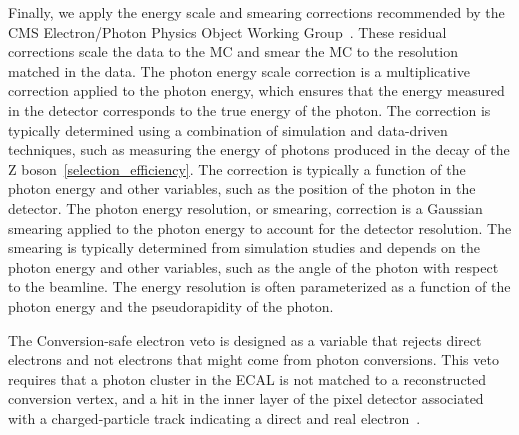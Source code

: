 Finally, we apply the energy scale and smearing corrections recommended by the CMS Electron/Photon Physics Object Working Group~\cite{EGM_twiki}. These residual corrections scale the data to the MC and smear the MC to the resolution matched in the data. The photon energy scale correction is a multiplicative correction applied to the photon energy, which ensures that the energy measured in the detector corresponds to the true energy of the photon. The correction is typically determined using a combination of simulation and data-driven techniques, such as measuring the energy of photons produced in the decay of the Z boson~\ref{selection_efficiency}. The correction is typically a function of the photon energy and other variables, such as the position of the photon in the detector. The photon energy resolution, or smearing, correction is a Gaussian smearing applied to the photon energy to account for the detector resolution. The smearing is typically determined from simulation studies and depends on the photon energy and other variables, such as the angle of the photon with respect to the beamline. The energy resolution is often parameterized as a function of the photon energy and the pseudorapidity of the photon.

The Conversion-safe electron veto is designed as a variable that rejects direct electrons and not electrons that might come from photon conversions. This veto requires that a photon cluster in the ECAL is not matched to a reconstructed conversion vertex, and a hit in the inner layer of the pixel detector associated with a charged-particle track indicating a direct and real electron~\cite{CMS:2015myp}. 



